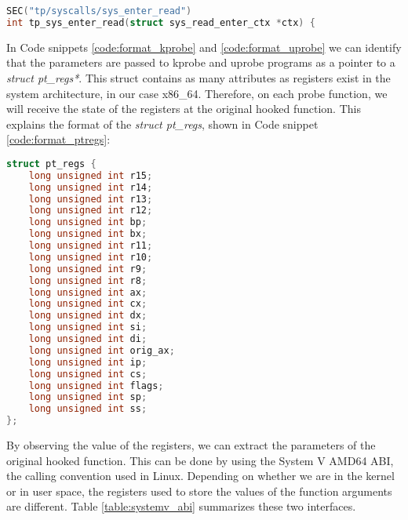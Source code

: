 \begin{lstlisting}[language=C, caption={Probe function for a tracepoint on the start of the syscall sys\_read.}, label={code:format_tracepoint}]
SEC("tp/syscalls/sys_enter_read") 
int tp_sys_enter_read(struct sys_read_enter_ctx *ctx) { 
\end{lstlisting}

In Code snippets \ref{code:format_kprobe} and \ref{code:format_uprobe} we can identify that the parameters are passed to kprobe and uprobe programs as a pointer to a \textit{struct pt\_regs*}. This struct contains as many attributes as registers exist in the system architecture, in our case x86\_64. Therefore, on each probe function, we will receive the state of the registers at the original hooked function. This explains the format of the \textit{struct pt\_regs}, shown in Code snippet \ref{code:format_ptregs}:

\begin{lstlisting}[language=C, caption={Format of struct pt\_regs.}, label={code:format_ptregs}]
struct pt_regs {
	long unsigned int r15;
	long unsigned int r14;
	long unsigned int r13;
	long unsigned int r12;
	long unsigned int bp;
	long unsigned int bx;
	long unsigned int r11;
	long unsigned int r10;
	long unsigned int r9;
	long unsigned int r8;
	long unsigned int ax;
	long unsigned int cx;
	long unsigned int dx;
	long unsigned int si;
	long unsigned int di;
	long unsigned int orig_ax;
	long unsigned int ip;
	long unsigned int cs;
	long unsigned int flags;
	long unsigned int sp;
	long unsigned int ss;
};
\end{lstlisting}

By observing the value of the registers, we can extract the parameters of the original hooked function. This can be done by using the System V AMD64 ABI\cite{8664_params_abi}, the calling convention used in Linux. Depending on whether we are in the kernel or in user space, the registers used to store the values of the function arguments are different. Table \ref{table:systemv_abi} summarizes these two interfaces. 

